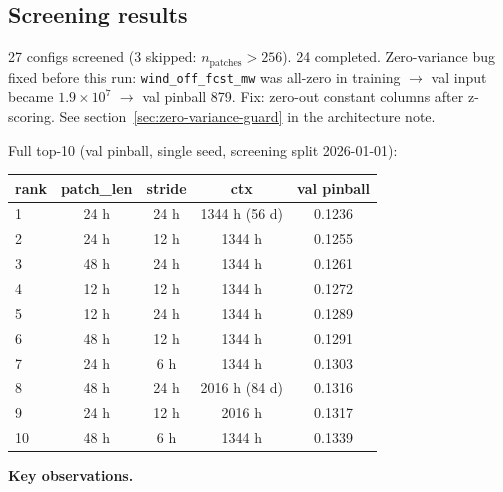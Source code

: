 \subsection{Screening results}

27 configs screened (3 skipped: $n_\text{patches} > 256$). 24 completed.
Zero-variance bug fixed before this run: \texttt{wind\_off\_fcst\_mw} was
all-zero in training $\to$ val input became $1.9 \times 10^7$
$\to$ val pinball 879. Fix: zero-out constant columns after z-scoring.
See section~\ref{sec:zero-variance-guard} in the architecture note.

Full top-10 (val pinball, single seed, screening split 2026-01-01):

\begin{center}
\begin{tabular}{lcccc}
\toprule
rank & patch\_len & stride & ctx & val pinball \\
\midrule
1  & 24 h & 24 h & 1344 h (56 d) & 0.1236 \\
2  & 24 h & 12 h & 1344 h         & 0.1255 \\
3  & 48 h & 24 h & 1344 h         & 0.1261 \\
4  & 12 h & 12 h & 1344 h         & 0.1272 \\
5  & 12 h & 24 h & 1344 h         & 0.1289 \\
6  & 48 h & 12 h & 1344 h         & 0.1291 \\
7  & 24 h & 6 h  & 1344 h         & 0.1303 \\
8  & 48 h & 24 h & 2016 h (84 d)  & 0.1316 \\
9  & 24 h & 12 h & 2016 h         & 0.1317 \\
10 & 48 h & 6 h  & 1344 h         & 0.1339 \\
\bottomrule
\end{tabular}
\end{center}

\textbf{Key observations.}

